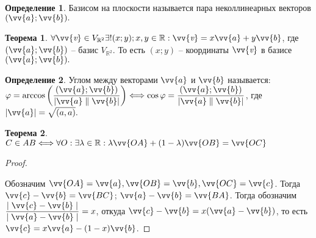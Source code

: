 \documentclass[12pt]{article}
\theoremstyle{definition}
\newtheorem{theorem}{Теорема}[section]
\newtheorem{definition}{Определение}
\newcommand{\R}{\mathbb{R}}
\begin{document}
\begin{definition}
    Базисом на плоскости называется пара неколлинеарных векторов $(\vv{a};\vv{b}).$
\end{definition}

\begin{theorem}
    $\forall \vv{\textit{v}}\in V_{\R^2} \exists!(x;y);x,y\in \R: \vv{\textit{v}}=x\vv{a}+y\vv{b}$, где $(\vv{a};\vv{b})$ -- базис $V_{\R^2}.$ То есть $(x;y)$ -- координаты $\vv{\textit{v}}$ в базисе $(\vv{a};\vv{b}).$
\end{theorem}

\begin{definition}
    Углом между векторами $\vv{a}$ и $\vv{b}$ называется: $\varphi=\arccos \left( \dfrac{(\vv{a};\vv{b})}{|\vv{a}\parallel\vv{b}|}\right)\Longleftrightarrow \cos \varphi = \dfrac{(\vv{a};\vv{b})}{|\vv{a}\parallel\vv{b}|}$, где $|\vv{a}|=\sqrt{(a,a)}.$
\end{definition}

\begin{theorem}
    $C\in AB \Longleftrightarrow \forall O: \exists \lambda \in \R: \lambda \vv{OA}+(1-\lambda) \vv{OB}=\vv{OC}$
\end{theorem}
    \begin{proof}
    $ $\par\nobreak\ignorespaces
    \begin{center}
    \end{center}
        Обозначим $\vv{OA}=\vv{a},\vv{OB}=\vv{b},\vv{OC}=\vv{c}$. Тогда $\vv{c}-\vv{b}=\vv {BC}$; $\vv{a}-\vv{b}=\vv{BA}$. Тогда обозначим $\dfrac{\mid \vv{c}-\vv{b}\mid }{\mid \vv{a}-\vv{b}\mid }=x$, откуда $\vv{c}-\vv{b}=x(\vv{a}-\vv{b})$, то есть $\vv{c}=x\vv{a}-(1-x)\vv{b}$.
    \end{proof}
\end{document}
